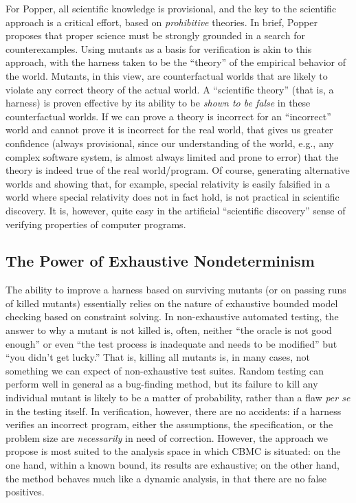 \documentclass[conference]{IEEEtran}
\begin{document}
For Popper, all scientific knowledge is provisional, and the key to
the scientific approach is a critical effort, based on
\emph{prohibitive} theories.  In brief, Popper proposes that proper
science must be strongly grounded in a search for counterexamples.
Using mutants as a basis for verification is akin to this approach,
with the harness taken to be the ``theory'' of the empirical behavior
of the world.  Mutants, in this view, are counterfactual worlds that
are likely to violate any correct theory of the actual world.  A
``scientific theory'' (that is, a harness) is proven effective by its
ability to be \emph{shown to be false} in these counterfactual worlds.
If we can prove a theory is incorrect for an ``incorrect'' world and
cannot prove it is incorrect for the real world, that gives us greater
confidence (always provisional, since our understanding of the world,
e.g., any complex software system, is almost always limited and prone
to error) that the theory is indeed true of the real world/program.
Of course, generating alternative worlds and showing that, for
example, special relativity is easily falsified in a world where
special relativity does not in fact hold, is not practical in
scientific discovery.  It is, however, quite easy in the artificial
``scientific discovery'' sense of verifying properties of computer programs.

\subsection{The Power of Exhaustive Nondeterminism}

The ability to improve a harness based on surviving mutants (or on
passing runs of killed mutants) essentially relies on the nature of
exhaustive bounded model checking based on constraint solving.  In
non-exhaustive automated testing, the answer to why a mutant is not
killed is, often, neither ``the oracle is not good enough'' or even
``the test process is inadequate and needs to be modified'' but ``you
didn't get lucky.''  That is, killing all mutants is, in many cases,
not something we can expect of non-exhaustive test suites.  Random
testing \cite{HamletOnly,ICSEDiff} can perform well in general as a
bug-finding method, but its failure to kill any individual mutant is
likely to be a matter of probability, rather than a flaw \emph{per se}
in the testing itself.  In verification, however, there are no
accidents: if a harness verifies an incorrect program, either the
assumptions, the specification, or the problem size are \emph{necessarily} in
need of correction.  However, the approach we propose is most suited
to the analysis space in which CBMC is situated: on the one hand,
within a known bound, its results are exhaustive; on the other hand,
the method behaves much like a dynamic analysis, in that there are no
false positives.
\end{document}
